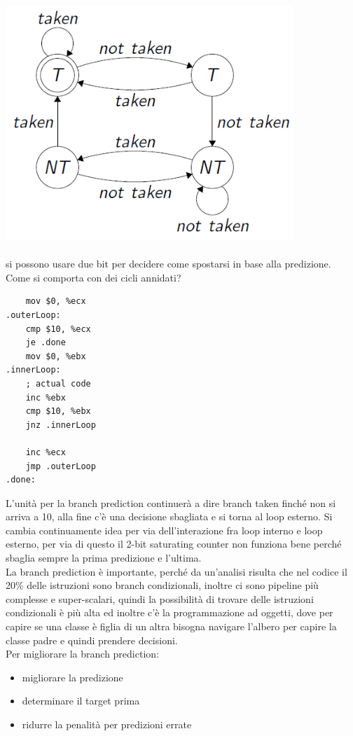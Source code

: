 \documentclass[12pt, oneside]{extbook} %
\begin{document}
\includegraphics[scale=0.7]{immagini/2bit_pred}\\\\
si possono usare due bit per decidere come spostarsi in base alla predizione. Come si comporta con dei cicli annidati? 
\begin{lstlisting}
	mov $0, %ecx
.outerLoop:
	cmp $10, %ecx
	je .done
	mov $0, %ebx
.innerLoop:
	; actual code
	inc %ebx
	cmp $10, %ebx
	jnz .innerLoop
	
	inc %ecx
	jmp .outerLoop
.done:
\end{lstlisting}
L'unità per la branch prediction continuerà a dire branch taken finché non si arriva a 10, alla fine c'è una decisione sbagliata e si torna al loop esterno. Si cambia continuamente idea per via dell'interazione fra loop interno e loop esterno, per via di questo il 2-bit saturating counter non funziona bene perché sbaglia sempre la prima predizione e l'ultima.\\ La branch prediction è importante, perché da un'analisi risulta che nel codice il 20\% delle istruzioni sono branch condizionali, inoltre ci sono pipeline più complesse e super-scalari, quindi la possibilità di trovare delle istruzioni condizionali è più alta ed inoltre c'è la programmazione ad oggetti, dove per capire se una classe è figlia di un altra bisogna navigare l'albero per capire la classe padre e quindi prendere decisioni.\\ Per migliorare la branch prediction:
\begin{itemize}
\item migliorare la predizione
\item determinare il target prima
\item ridurre la penalità per predizioni errate
\end{itemize}
\end{document}
